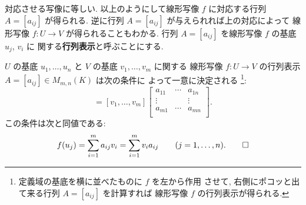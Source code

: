 \documentclass[12pt,twoside]{jarticle}
\begin{document}
対応させる写像に等しい.
以上のようにして線形写像 $f$ に対応する行列 $A=[a_{ij}]$ が得られる.
逆に行列 $A=[a_{ij}]$ が与えられれば上の対応によって
線形写像 $f:U\to V$ が得られることもわかる.
行列 $A=[a_{ij}]$ を線形写像 $f$ の基底 $u_j$, $v_i$ に
関する{\bf 行列表示}と呼ぶことにする.

\begin{summary}[線形写像の行列表示]
  $U$ の基底 $u_1,\ldots,u_n$ と $V$ の基底 $v_1,\ldots,v_m$ に関する
  線形写像 $f:U\to V$ の行列表示 $A=[a_{ij}]\in M_{m,n}(K)$ は次の条件に
  よって一意に決定される%
  \footnote{定義域の基底を横に並べたものに $f$ を左から作用
    させて, 右側にポコッと出て来る行列 $A=[a_{ij}]$ を計算すれば
    線形写像 $f$ の行列表示が得られる.}:
  \begin{equation*}
    [f(u_1),\ldots,f(u_n)]
    = [v_1,\ldots,v_m]
    \begin{bmatrix}
    a_{11} & \cdots & a_{1n} \\
    \vdots &        & \vdots \\
    a_{m1} & \cdots & a_{mn} \\
    \end{bmatrix}.
  \end{equation*}
  この条件は次と同値である:
  \begin{equation*}
    f(u_j)
    = \sum_{i=1}^m a_{ij} v_i
    = \sum_{i=1}^m v_i a_{ij}
    \qquad (j=1,\ldots,n).
  \qed
  \end{equation*}
\end{summary}

\end{document}
